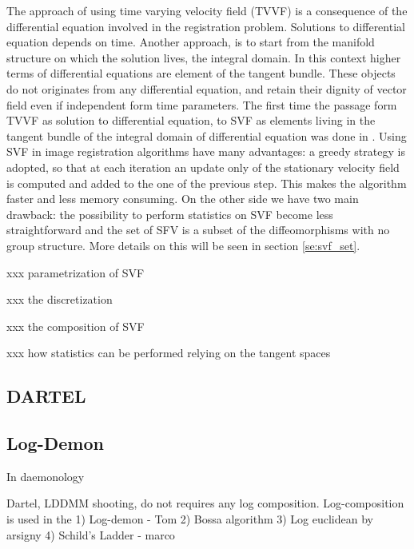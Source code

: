 The approach of using time varying velocity field (TVVF) is a consequence of the differential equation involved in the registration problem. Solutions to differential equation depends on time. Another approach, is to start from the manifold structure on which the solution lives, the integral domain. In this context higher terms of differential equations are element of the tangent bundle. These objects do not originates from any differential equation, and retain their dignity of vector field even if independent form time parameters. The first time the passage form TVVF as solution to differential equation, to SVF as elements living in the tangent bundle of the integral domain of differential equation was done in \cite{arsigny2006log}. Using SVF in image registration algorithms have many advantages: a greedy strategy is adopted, so that at each iteration an update only of the stationary velocity field is computed and added to the one of the previous step. This makes the algorithm faster and less memory consuming. On the other side we have two main drawback: the possibility to perform statistics on SVF become less straightforward and the set of SFV is a subset of the diffeomorphisms with no group structure. More details on this will be seen in section \ref{se:svf_set}.

xxx parametrization of SVF

xxx the discretization

xxx the composition of SVF 

xxx how statistics can be performed relying on the tangent spaces


\subsection{DARTEL}


\subsection{Log-Demon}

In daemonology 

Dartel, LDDMM shooting, do not requires any log composition.
Log-composition is used in the 
1) Log-demon  - Tom
2) Bossa algorithm
3) Log euclidean by arsigny
4) Schild's Ladder - marco



